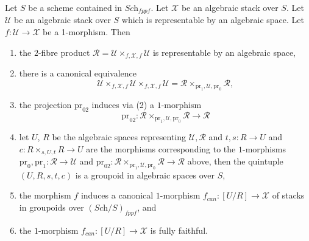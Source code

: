 \begin{lemma}
\label{lemma-map-space-into-stack}
Let $S$ be a scheme contained in $\textit{Sch}_{fppf}$.
Let $\mathcal{X}$ be an algebraic stack over $S$.
Let $\mathcal{U}$ be an algebraic stack over $S$ which
is representable by an algebraic space.
Let $f : \mathcal{U} \to \mathcal{X}$ be a 1-morphism. Then
\begin{enumerate}
\item the $2$-fibre product
$\mathcal{R} = \mathcal{U} \times_{f, \mathcal{X}, f} \mathcal{U}$
is representable by an algebraic space,
\item there is a canonical equivalence
$$
\mathcal{U} \times_{f, \mathcal{X}, f} \mathcal{U}
\times_{f, \mathcal{X}, f} \mathcal{U} =
\mathcal{R} \times_{\text{pr}_1, \mathcal{U}, \text{pr}_0} \mathcal{R},
$$
\item the projection $\text{pr}_{02}$ induces via (2) a $1$-morphism
$$
\text{pr}_{02} :
\mathcal{R} \times_{\text{pr}_1, \mathcal{U}, \text{pr}_0} \mathcal{R}
\longrightarrow
\mathcal{R}
$$
\item let $U$, $R$ be the algebraic spaces representing
$\mathcal{U}, \mathcal{R}$ and $t, s : R \to U$ and
$c : R \times_{s, U, t} R \to U$ are the morphisms corresponding
to the $1$-morphisms
$\text{pr}_0, \text{pr}_1 : \mathcal{R} \to \mathcal{U}$
and
$\text{pr}_{02} :
\mathcal{R} \times_{\text{pr}_1, \mathcal{U}, \text{pr}_0} \mathcal{R} \to
\mathcal{R}$ above, then the quintuple $(U, R, s, t, c)$ is a groupoid in
algebraic spaces over $S$,
\item the morphism $f$ induces a canonical $1$-morphism
$f_{can} : [U/R] \to \mathcal{X}$
of stacks in groupoids over $(\textit{Sch}/S)_{fppf}$, and
\item the $1$-morphism $f_{can} : [U/R] \to \mathcal{X}$ is fully faithful.
\end{enumerate}
\end{lemma}

